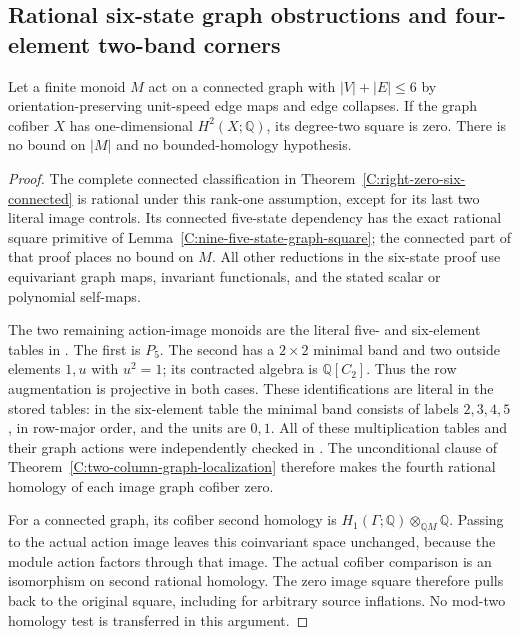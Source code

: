 \subsection{Rational six-state graph obstructions and four-element two-band corners}

\begin{lemma}
\label{C:connected-six-rational-square}
Let a finite monoid $M$ act on a connected graph with
$|V|+|E|\leq6$ by orientation-preserving unit-speed
edge maps and edge collapses.  If the graph cofiber
$X$ has one-dimensional $H^2(X;\mathbb Q)$, its
degree-two square is zero.  There is no bound on
$|M|$ and no bounded-homology hypothesis.
\end{lemma}
\begin{proof}
The complete connected classification in
Theorem~\ref{C:right-zero-six-connected} is rational
under this rank-one assumption, except for its last
two literal image controls.  Its connected five-state
dependency has the exact rational square primitive
of Lemma~\ref{C:nine-five-state-graph-square}; the
connected part of that proof places no bound on $M$.
All other reductions in the six-state proof use
equivariant graph maps, invariant functionals, and
the stated scalar or polynomial self-maps.

The two remaining action-image monoids are the
literal five- and six-element tables in
.
The first is $P_5$.  The second has a $2\times2$
minimal band and two outside elements $1,u$ with
$u^2=1$; its contracted algebra is
$\mathbb Q[C_2]$.  Thus the row augmentation is
projective in both cases.  These identifications
are literal in the stored tables: in the six-element
table the minimal band consists of labels $2,3,4,5$,
in row-major order, and the units are $0,1$.
All of these multiplication tables and their
graph actions were independently checked in
.
The unconditional clause of
Theorem~\ref{C:two-column-graph-localization}
therefore makes the fourth rational homology of
each image graph cofiber zero.

For a connected graph, its cofiber second homology
is $H_1(\Gamma;\mathbb Q)\otimes_{\mathbb QM}\mathbb Q$.
Passing to the actual action image leaves this
coinvariant space unchanged, because the module
action factors through that image.  The actual
cofiber comparison is an isomorphism on second
rational homology.  The zero image square therefore
pulls back to the original square, including for
arbitrary source inflations.  No mod-two homology
test is transferred in this argument.
\end{proof}

